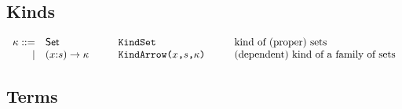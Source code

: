 \documentclass[12pt]{article}
\newcommand{\s}{s}
\newcommand{\n}{x} %
\newcommand{\x}{\n} %
\renewcommand{\k}{\kappa} %
\newcommand{\kSet}{\mathsf{Set}}
\newcommand{\kArrow}[3]{(#1{:}#2)\to #3}
\begin{document}
\subsection{Kinds}
\[
\begin{array}{rl@{\hspace{1cm}}l@{\hspace{1cm}}l}
\k ::= & \kSet & \texttt{KindSet} & \mbox{kind of (proper) sets}\\
 |& \kArrow{\x}{\s}{\k} & \texttt{KindArrow($\x$,$\s$,$\k$)} & \mbox{(dependent) kind of a family of sets}
\end{array}
\]

\subsection{Terms}
\end{document}
